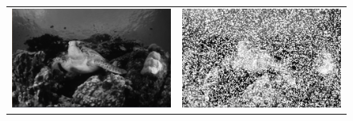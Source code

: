 \begin{landscape}
		\begin{figure}[!h]
			\begin{tabular}{cc}
				\includegraphics[width=12.25cm]{Imagenes/Ruido_sp_50_mediana_5.png} & \includegraphics[width=12.25cm]{Imagenes/Ruido_sp_50_max_5.png} \\

\end{tabular}
\end{figure}
\end{landscape}
